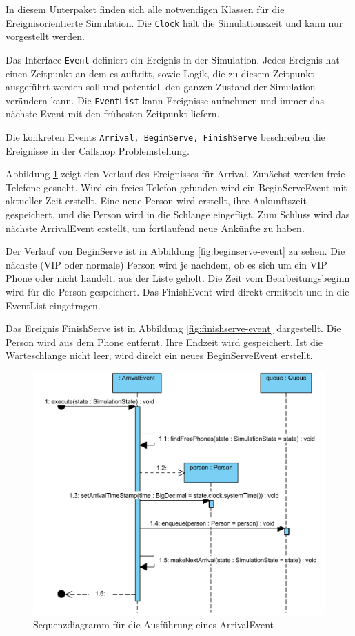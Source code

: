 In diesem Unterpaket finden sich alle notwendigen Klassen für die Ereignisorientierte Simulation. Die \texttt{Clock} hält die Simulationszeit und kann nur vorgestellt werden. 

Das Interface \texttt{Event} definiert ein Ereignis in der Simulation. Jedes Ereignis hat einen Zeitpunkt an dem es auftritt, sowie Logik, die zu diesem Zeitpunkt ausgeführt werden soll und potentiell den ganzen Zustand der Simulation verändern kann. Die \texttt{EventList} kann Ereignisse aufnehmen und immer das nächste Event mit den frühesten Zeitpunkt liefern. 

Die konkreten Events \texttt{Arrival, BeginServe, FinishServe} beschreiben die Ereignisse in der Callshop Problemstellung.

Abbildung \ref{fig:arrival-event} zeigt den Verlauf des Ereignisses für Arrival. Zunächst werden freie Telefone gesucht. Wird ein freies Telefon gefunden wird ein BeginServeEvent mit aktueller Zeit erstellt. Eine neue Person wird erstellt, ihre Ankunftszeit gespeichert, und die Person wird in die Schlange eingefügt. Zum Schluss wird das nächste ArrivalEvent erstellt, um fortlaufend neue Ankünfte zu haben.

Der Verlauf von BeginServe ist in Abbildung \ref{fig:beginserve-event} zu sehen. Die nächste (VIP oder normale) Person wird je nachdem, ob es sich um ein VIP Phone oder nicht handelt, aus der Liste geholt. Die Zeit vom Bearbeitungsbeginn wird für die Person gespeichert. Das FinishEvent wird direkt ermittelt und in die EventList eingetragen.

Das Ereignis FinishServe ist in Abbildung \ref{fig:finishserve-event} dargestellt. Die Person wird aus dem Phone entfernt. Ihre Endzeit wird gespeichert. Ist die Warteschlange nicht leer, wird direkt ein neues BeginServeEvent erstellt. 


\begin{figure}[ht]
	\centering
	\includegraphics[scale=0.5]{abbildungen/uml/Arrival.pdf}
	\caption{Sequenzdiagramm für die Ausführung eines ArrivalEvent}
	\label{fig:arrival-event}
\end{figure}

